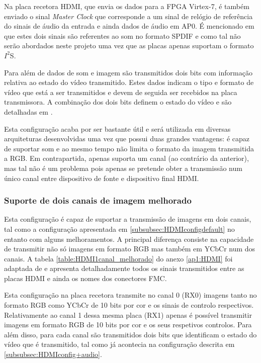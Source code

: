 Na placa recetora HDMI, que envia os dados para a FPGA Virtex-7, é também enviado o sinal \textit{Master Clock} que corresponde a um sinal de relógio de referência do sinais de áudio da entrada e ainda dados de áudio em AP0. É mencionado em \cite{R016} que estes dois sinais são referentes ao som no formato SPDIF e como tal não serão abordados neste projeto uma vez que as placas apenas suportam o formato $I^{2}$S.

Para além de dados de som e imagem são transmitidos dois bits com informação relativa ao estado do vídeo transmitido. Estes dados indicam o tipo e formato de vídeo que está a ser transmitidos e devem de seguida ser recebidos na placa transmissora. A combinação dos dois bits definem o estado do vídeo e são detalhadas em \cite{R014}.

Esta configuração acaba por ser bastante útil e será utilizada em diversas arquiteturas desenvolvidas uma vez que possui duas grandes vantagens: é capaz de suportar som e ao mesmo tempo não limita o formato da imagem transmitida a RGB. Em contrapartida, apenas suporta um canal (ao contrário da anterior), mas tal não é um problema pois apenas se pretende obter a transmissão num único canal entre dispositivo de fonte e dispositivo final HDMI. 


\subsubsection{Suporte de dois canais de imagem melhorado} \label{subsubsec:HDMIconfigMelhorado}


Esta configuração é capaz de suportar a transmissão de imagens em dois canais, tal como a configuração apresentada em \ref{subsubsec:HDMIconfigdefault} no entanto com alguns melhoramentos. A principal diferença consiste na capacidade de transmitir não só imagens em formato RGB mas também em YCbCr num dos canais. A tabela \ref{table:HDMI1canal_melhorado} do anexo \ref{ap1:HDMI} foi adaptada de \cite{R013} e apresenta detalhadamente todos os sinais transmitidos entre as placas HDMI e ainda os nomes dos conectores FMC.

Esta configuração na placa recetora transmite no canal 0 (RX0)  imagens tanto no formato RGB como YCbCr de 10 bits por cor e os sinais de controlo respectivos. Relativamente ao canal 1 dessa mesma placa (RX1) apenas é possível transmitir imagens em formato RGB de 10 bits por cor e os seus respetivos controlos. Para além disso, para cada canal são transmitidos dois bits que identificam o estado do vídeo que é transmitido, tal como já acontecia na configuração descrita em \ref{subsubsec:HDMIconfig+audio}.

